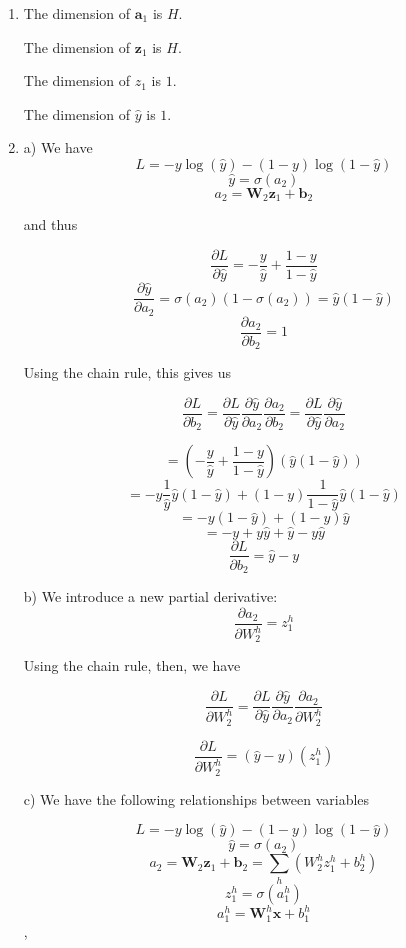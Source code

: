 \documentclass[submit]{harvardml}
\begin{document}
\begin{enumerate}

\item 
The dimension of $\mathbf{a}_1$ is $H$.

The dimension of $\mathbf{z}_1$ is $H$.

The dimension of $z_1$ is $1$.

The dimension of $\hat{y}$ is $1$.

\item

a)
We have 
$$L = -y \log (\hat{y}) - (1 - y) \log (1 - \hat{y})$$
$$\hat{y} = \sigma(a_2)$$
$$a_2 = \mathbf{W}_2\mathbf{z}_1 + \mathbf{b}_2$$

and thus

$$\frac{\partial L}{\partial\hat{y}}= -\frac{y}{\hat{y}} + \frac{1-y}{1-\hat{y}}$$
$$\frac{\partial\hat{y}}{\partial a_2}=\sigma(a_2)(1-\sigma(a_2))=\hat{y}(1-\hat{y})$$
$$\frac{\partial a_2}{\partial b_2} = 1$$

Using the chain rule, this gives us

$$\frac{\partial L}{\partial b_2} =\frac{\partial L}{\partial\hat{y}}\frac{\partial\hat{y}}{\partial a_2}\frac{\partial a_2}{\partial b_2} = \frac{\partial L}{\partial\hat{y}}\frac{\partial\hat{y}}{\partial a_2}$$

$$=\left(-\frac{y}{\hat{y}} + \frac{1-y}{1-\hat{y}} \right) (\hat{y}(1-\hat{y}))$$
$$ = -y \frac{1}{\hat{y}}  \hat{y}(1 - \hat{y}) + (1 - y) \frac{1}{1 - \hat{y}}  \hat{y}(1 - \hat{y})$$
$$ = -y (1 - \hat{y}) + (1 - y)   \hat{y}$$
$$ = -y + y\hat{y} + \hat{y} - y\hat{y}$$
$$ \boxed{\frac{\partial L}{\partial b_2} = \hat{y}-y} $$


b) We introduce a new partial derivative:
$$\frac{\partial a_2}{\partial W_2^h} = z_1^h$$

Using the chain rule, then, we have 


$$\frac{\partial L}{\partial W_2^h}= \frac{\partial L}{\partial\hat{y}} \frac{\partial\hat{y}}{\partial a_2} \frac{\partial a_2}{\partial W_2^h}$$

$$\boxed{
    \frac{\partial L}{\partial W_2^h}
    = (\hat{y}-y)(z_1^h)
}
$$



c) We have the following relationships between variables

$$L = -y \log (\hat{y}) - (1 - y) \log (1 - \hat{y})$$
$$\hat{y}=\sigma(a_2)$$
$$a_2=\mathbf{W}_2\mathbf{z}_1+\mathbf{b}_2=\sum_h (W_2^h z_1^h + b_2^h)$$
$$z^h_1=\sigma(a^h_1)$$
 $$a^h_1=\mathbf{W}^h_1\mathbf{x}+b^h_1$$,
 

\end{enumerate}
\end{document}
